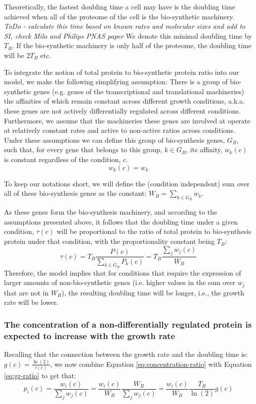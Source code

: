\documentclass[notitlepage]{article}
\begin{document}
Theoretically, the fastest doubling time a cell may have is the doubling time achieved when all of the proteome of the cell is the bio-synthetic machinery.
\emph{ToDo - calculate this time based on known rates and molecular sizes and add to SI, check Milo and Philips PNAS paper}
We denote this minimal doubling time by $T_B$.
If the bio-synthetic machinery is only half of the proteome, the doubling time will be $2T_B$ etc.

To integrate the notion of total protein to bio-synthetic protein ratio into our model, we make the following simplifying assumption:
There is a group of bio-synthetic genes (e.g. genes of the transcriptional and translational machineries) the affinities of which remain constant across different growth conditions, a.k.a. these genes are not actively differentially regulated across different conditions.
Furthermore, we assume that the machineries these genes are involved at operate at relatively constant rates and active to non-active ratios across conditions.
Under these assumptions we can define this group of bio-synthesis genes, $G_B$, such that, for every gene that belongs to this group, $k \in G_B$, its affinity, $w_k(c)$ is constant regardless of the condition, $c$.
\begin{equation}
  \label{eq:biosynth-def}
  w_k(c)=w_k
\end{equation}

To keep our notations short, we will define the (condition independent) sum over all of these bio-synthesis genes as the constant: $W_B = \sum_{k\in G_B}w_k$.

As these genes form the bio-synthesis machinery, and according to the assumptions presented above, it follows that the doubling time under a given condition, $\tau(c)$ will be proportional to the ratio of total protein to bio-synthesis protein under that condition, with the proportionality constant being $T_B$:
\begin{equation}
  \label{eq:gr-ratio}
  \tau(c) = T_B\frac{P(c)}{\sum_{k\in G_B}P_k(c)}=T_B\frac{\sum_jw_j(c)}{W_B}
\end{equation}
Therefore, the model implies that for conditions that require the expression of larger amounts of non-bio-synthetic genes (i.e. higher values in the sum over $w_j$ that are not in $W_B$), the resulting doubling time will be longer, i.e., the growth rate will be lower.

\subsubsection{The concentration of a non-differentially regulated protein is expected to increase with the growth rate} 
Recalling that the connection between the growth rate and the doubling time is: $g(c)=\frac{\ln(2)}{\tau(c)}$, we now combine Equation \ref{eq:concentration-ratio} with Equation \ref{eq:gr-ratio} to get that:
\begin{equation}
  \label{eq:default-response}
  p_i(c)=\frac{w_i(c)}{\sum_jw_j(c)}=\frac{w_i(c)}{W_B}\frac{W_B}{\sum_jw_j(c)}=\frac{w_i(c)}{W_B}\frac{T_B}{\ln(2)}g(c)
\end{equation}
\end{document}
